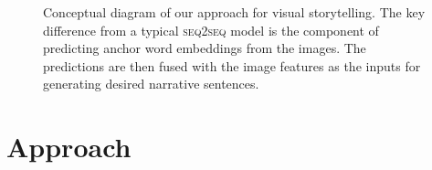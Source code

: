 \begin{figure}[t]
    \centering
    \caption{Conceptual diagram of our approach for visual storytelling. The key difference from a typical \textsc{seq2seq} model is the component of predicting anchor word embeddings from the images. The predictions are then fused with the image features as the inputs for generating desired narrative sentences.}
    \label{fig:overall}
\end{figure}

\begin{table}[t]
    \small
    \centering
    \caption{Adding ground-truth words as anchor words to a \textsc{seq2seq} model significantly improves its performance where only image features are used. The higher numerical value indicates better performance.}
    \vspace{-0.2in}
    \label{tab:gt_anchor}
\end{table}




\section{Approach}
\label{sApproach}

